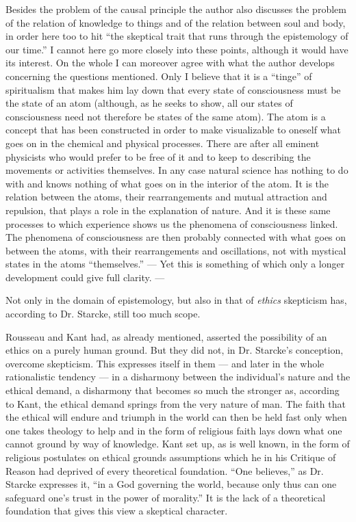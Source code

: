 \documentclass[12pt,a4paper,openany]{book}
\newcommand{\opage}[1]{\marginnote{\footnotesize\textit{[#1]}}}
\begin{document}
Besides the problem of the causal principle the author
also discusses the problem of the relation of knowledge to things
and of the relation between soul and body, in order here too to
hit ``the skeptical trait that runs through the
epistemology of our time.'' I cannot here go more closely into
these points, although it would have its interest. On the
whole I can moreover agree with what the author develops
concerning the questions mentioned. Only I believe that it is a
``tinge'' of spiritualism that makes him lay down that
every state of consciousness must be the state of an atom (although,
as he seeks to show, all our states of consciousness
need not therefore be states of the same atom). The atom
is a concept that has been constructed in order to make visualizable to oneself
\opage{31}what goes on in the chemical and physical processes.
There are after all eminent physicists who would prefer to be
free of it and to keep to describing the movements
or activities themselves. In any case
natural science has nothing to do with and knows nothing of what
goes on in the interior of the atom. It is the relation between the atoms,
their rearrangements and mutual attraction and repulsion,
that plays a role in the explanation of nature. And it is these
same processes to which experience shows us the
phenomena of consciousness linked. The phenomena of consciousness are then
probably connected with what goes on between the atoms,
with their rearrangements and oscillations, not with mystical
states in the atoms ``themselves.'' --- Yet this is something of which only
a longer development could give full clarity. ---

Not only in the domain of epistemology, but also in that of \emph{ethics}
skepticism has, according to Dr. Starcke, still too much
scope.

Rousseau and Kant had, as already mentioned, asserted
the possibility of an ethics on a purely human ground. But
they did not, in Dr. Starcke's conception, overcome
skepticism. This expresses itself in them --- and later in the whole
rationalistic tendency --- in a disharmony between the individual's
nature and the ethical demand, a disharmony that becomes so
much the stronger as, according to Kant, the ethical demand
springs from the very nature of man. The faith that the
ethical will endure and triumph in the world can then be held fast only
when one takes theology to help and in the form of religious faith
lays down what one cannot ground by way of knowledge.
Kant set up, as is well known, in the form of religious
postulates on ethical grounds assumptions which he in his Critique of Reason
had deprived of every theoretical foundation. ``One believes,'' as
Dr. Starcke expresses it, ``in a God governing the world,
because only thus can one safeguard one's trust in the power
of morality.'' It is the lack of a theoretical foundation that gives
this view a skeptical character.
\end{document}

